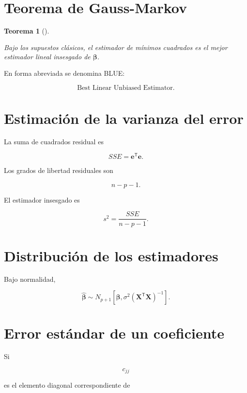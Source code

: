 \documentclass[
  spanish,
  11pt,
  letterpaper,
  DIV=11,
  numbers=noendperiod]{scrreprt}
\theoremstyle{definition}
\theoremstyle{plain}
\newtheorem{theorem}{Teorema}[chapter]
\theoremstyle{definition}
\theoremstyle{remark}
\begin{document}
\section{Teorema de Gauss-Markov}\label{teorema-de-gauss-markov-1}

\begin{theorem}[]\protect\hypertarget{thm-gauss-markov-multiple}{}\label{thm-gauss-markov-multiple}

Bajo los supuestos clásicos, el estimador de mínimos cuadrados es el
mejor estimador lineal insesgado de \(\boldsymbol{\beta}\).

\end{theorem}

En forma abreviada se denomina BLUE:

\[
\text{Best Linear Unbiased Estimator}.
\]

\section{Estimación de la varianza del
error}\label{estimaciuxf3n-de-la-varianza-del-error-1}

La suma de cuadrados residual es

\[
SSE
=
\mathbf{e}^{\mathsf T}\mathbf{e}.
\]

Los grados de libertad residuales son

\[
n-p-1.
\]

El estimador insesgado es

\[
s^2
=
\frac{
SSE
}{
n-p-1
}.
\]

\section{Distribución de los
estimadores}\label{distribuciuxf3n-de-los-estimadores-1}

Bajo normalidad,

\[
\widehat{\boldsymbol{\beta}}
\sim
N_{p+1}
\left[
\boldsymbol{\beta},
\sigma^2
\left(
\mathbf{X}^{\mathsf T}\mathbf{X}
\right)^{-1}
\right].
\]

\section{Error estándar de un
coeficiente}\label{error-estuxe1ndar-de-un-coeficiente}

Si

\[
c_{jj}
\]

es el elemento diagonal correspondiente de
\end{document}
